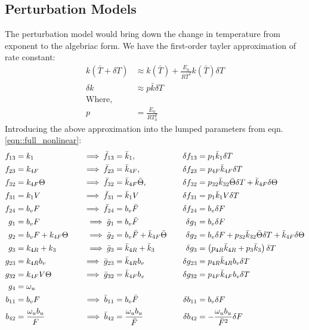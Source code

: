 \subsection{Perturbation Models}
The perturbation model would bring down the change in
temperature from exponent to the algebriac form. We have the first-order tayler
approximation of rate constant:
\begin{align*}
    k(\bar T + \delta T) &\approx k(\bar T) + \frac{E_a}{R\bar T^2} k(\bar T) \delta T\\
    \delta k &\approx p \bar k \delta T\\
    \text{Where,} \quad &\\
    p &= \frac{E_a}{RT_0^2}
\end{align*}
Introducing the above approximation into the lumped parameters from eqn.\ref{eqn::full_nonlinear}:
\begin{align*}
    f_{13} &= k_1 \quad&
    \implies \bar f_{13} &= \bar k_{1}, \quad&
    \delta f_{13} &= p_{1} \bar k_{1} \delta T\\
    f_{23} &= k_{4F} \quad &
    \implies \bar f_{23} &= \bar k_{4F}, \quad &
    \delta f_{23} &= p_{4F} \bar k_{4F} \delta T\\
    f_{32} &= k_{4F} \Theta \quad &
    \implies \bar f_{32} &= \bar k_{4F} \bar \Theta, \quad &
    \delta f_{32} &= p_{32}  \bar k_{32} \bar \Theta \delta T   +  \bar k_{4F} \delta \Theta
    \\
    f_{31} &= k_1 V \quad &
    \implies \bar f_{31} &= \bar k_1 V \quad &
    \delta f_{31} &= p_1 \bar k_1 V \delta T
    \\
    f_{24} &= b_v F
    \quad &
    \implies \bar f_{24} &= b_v \bar F
    \quad &
    \delta f_{24} &= b_v \delta F
    \\
    g_1    &= b_v F
    \quad &
    \implies \bar g_1 &= b_v \bar F
    \quad &
    \delta g_1 &= b_v \delta F
    \\
    g_2    &= b_v F + k_{4F} \Theta
    \quad &
    \implies \bar g_2 &= b_v \bar F + \bar k_{4F} \bar \Theta
    \quad &
    \delta g_2 &= b_v \delta F +  p_{32}  \bar k_{32} \bar \Theta \delta T   +  \bar k_{4F} \delta \Theta
    \\
    g_{3}  &= k_{4R}+k_3
    \quad &
    \implies \bar g_3 &= \bar k_{4R} + \bar k_3
    \quad &
    \delta g_3 &= \left(  p_{4R} \bar k_{4R} + p_3 \bar k_3 \right) \delta T
    \\
    g_{23} &= k_{4R} b_v
    \quad &
    \implies \bar g_{23} &= \bar k_{4R} b_v
    \quad &
    \delta g_{23} &= p_{4R} \bar k_{4R} b_v  \delta T
    \\
    g_{32} &= k_{4F} V \Theta
    \quad &
    \implies \bar g_{32} &= \bar k_{4F} b_v
    \quad &
    \delta g_{32} &= p_{4F} \bar k_{4F} b_v  \delta T
    \\
    g_4 &= \omega_u
    \\
    b_{11} &= b_v F
    \quad &
    \implies \bar b_{11} &= b_v \bar F
    \quad &
    \delta b_{11} &= b_v \delta F
    \\
    b_{42} &= \frac{\omega_u b_u}{F}
    \quad &
    \implies \bar b_{42} &= \frac{\omega_u b_u}{\bar F}
    \quad &
    \delta b_{42} &= -\frac{\omega_u b_u}{\bar F^2} \delta F
\end{align*}
